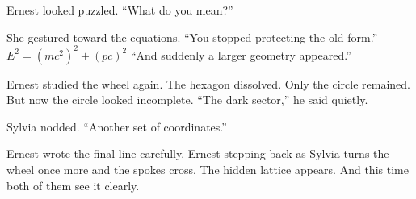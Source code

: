 Ernest looked puzzled. “What do you mean?”

She gestured toward the equations. “You stopped protecting the old form.” 
\(
E^2 = (mc^2)^2 + (pc)^2
\)
“And suddenly a larger geometry appeared.”

Ernest studied the wheel again. The hexagon dissolved. Only the circle remained. But now the circle looked incomplete. “The dark sector,” he said quietly.

Sylvia nodded. “Another set of coordinates.”

Ernest wrote the final line carefully. Ernest stepping back as Sylvia turns the wheel once more and the spokes cross. The hidden lattice appears. And this time both of them see it clearly.
